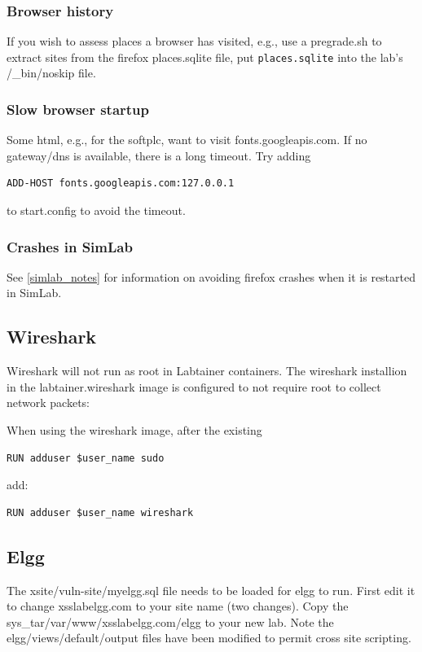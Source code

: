 \documentclass[12pt]{article}
\begin{document}
\subsubsection{Browser history}
If you wish to assess places a browser has visited, e.g., use a pregrade.sh to extract sites from the
firefox places.sqlite file, put {\tt places.sqlite} into the lab's /\_bin/noskip file.

\subsubsection{Slow browser startup}
Some html, e.g., for the softplc, want to visit fonts.googleapis.com.  If no gateway/dns is available, there is a long timeout.
Try adding 
\begin{verbatim}
ADD-HOST fonts.googleapis.com:127.0.0.1 
\end{verbatim}
\noindent to start.config to avoid the timeout.

\subsubsection{Crashes in SimLab}
See \ref{simlab_notes} for information on avoiding firefox crashes when it is restarted in SimLab.

\subsection{Wireshark}
Wireshark will not run as root in Labtainer containers.  
The wireshark installion in the labtainer.wireshark image is configured to not
require root to collect network packets:

When using the wireshark image, after the existing 
\begin{verbatim}
RUN adduser $user_name sudo
\end{verbatim}

\noindent add:

\begin{verbatim}
RUN adduser $user_name wireshark
\end{verbatim}

\subsection{Elgg}
The xsite/vuln-site/myelgg.sql file needs to be loaded for elgg to run.  First edit it to
change xsslabelgg.com to your site name (two changes).  Copy the sys\_tar/var/www/xsslabelgg.com/elgg
to your new lab.  Note the elgg/views/default/output files have been modified to permit cross site scripting.
\end{document}
